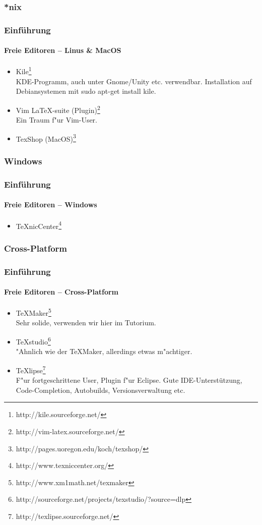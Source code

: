 \subsubsection{*nix}
\begin{frame}
\frametitle{Einf\"uhrung}
\framesubtitle{Freie Editoren -- Linus \& MacOS }
\begin{itemize}
 \item Kile\footnote{http://kile.sourceforge.net/}\\KDE-Programm, auch unter Gnome\slash Unity etc.
 verwendbar. Installation auf Debiansystemen mit {\ttfamily sudo apt-get
 install kile}.
  \item Vim \LaTeX -suite (Plugin)\footnote{http://vim-latex.sourceforge.net/}\\
  Ein Traum f"ur Vim-User.
  \item TexShop (MacOS)\footnote{http://pages.uoregon.edu/koch/texshop/}
\end{itemize}
\end{frame}


\subsubsection{Windows}
\begin{frame}
\frametitle{Einf\"uhrung}
\framesubtitle{Freie Editoren -- Windows}
\begin{itemize}
\item TeXnicCenter\footnote{http://www.texniccenter.org/}
\end{itemize}
\end{frame}


\subsubsection{Cross-Platform}
\begin{frame}
\frametitle{Einf\"uhrung}
\framesubtitle{Freie Editoren -- Cross-Platform}
\begin{itemize}
  \item TeXMaker\footnote{http://www.xm1math.net/texmaker}\\
   Sehr solide, verwenden wir hier im Tutorium.
  \item TeXstudio\footnote{http://sourceforge.net/projects/texstudio/?source=dlp}\\
  "Ahnlich wie der TeXMaker, allerdings etwas m"achtiger.
  \item TeXlipse\footnote{http://texlipse.sourceforge.net/}\\ F"ur fortgeschrittene User, Plugin f"ur
  Eclipse. Gute IDE-Unterst\"utzung, Code-Completion, Autobuilds, Versionsverwaltung etc.
\end{itemize}
\end{frame}

